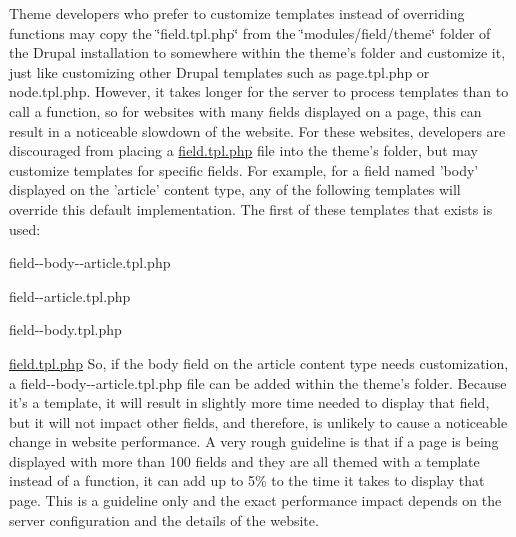 Theme developers who prefer to customize templates instead of overriding functions may copy the \char`\"{}field.tpl.php\char`\"{} from the \char`\"{}modules/field/theme\char`\"{} folder of the Drupal installation to somewhere within the theme's folder and customize it, just like customizing other Drupal templates such as page.tpl.php or node.tpl.php. However, it takes longer for the server to process templates than to call a function, so for websites with many fields displayed on a page, this can result in a noticeable slowdown of the website. For these websites, developers are discouraged from placing a \hyperlink{field_8tpl_8php}{field.tpl.php} file into the theme's folder, but may customize templates for specific fields. For example, for a field named 'body' displayed on the 'article' content type, any of the following templates will override this default implementation. The first of these templates that exists is used:
\begin{DoxyItemize}
\item field-\/-\/body-\/-\/article.tpl.php
\item field-\/-\/article.tpl.php
\item field-\/-\/body.tpl.php
\item \hyperlink{field_8tpl_8php}{field.tpl.php} So, if the body field on the article content type needs customization, a field-\/-\/body-\/-\/article.tpl.php file can be added within the theme's folder. Because it's a template, it will result in slightly more time needed to display that field, but it will not impact other fields, and therefore, is unlikely to cause a noticeable change in website performance. A very rough guideline is that if a page is being displayed with more than 100 fields and they are all themed with a template instead of a function, it can add up to 5\% to the time it takes to display that page. This is a guideline only and the exact performance impact depends on the server configuration and the details of the website.
\end{DoxyItemize}


